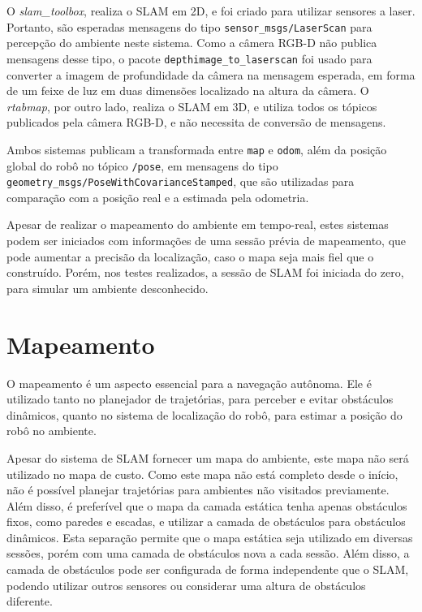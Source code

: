 \documentclass[repeatfields,xlists,xpacks,oneside,yearsonly]{ufrgscca}
\begin{document}
O \textit{slam\_toolbox}, realiza o SLAM em 2D, e foi criado para
utilizar sensores a laser. Portanto, são esperadas mensagens do tipo
\texttt{sensor\_msgs/LaserScan} para percepção do ambiente neste
sistema. Como a câmera RGB-D não publica mensagens desse tipo, o
pacote \texttt{depthimage\_to\_laserscan} foi usado para converter a
imagem de profundidade da câmera na mensagem esperada, em forma de um
feixe de luz em duas dimensões localizado na altura da câmera. O
\textit{rtabmap}, por outro lado, realiza o SLAM em 3D, e utiliza
todos os tópicos publicados pela câmera RGB-D, e não necessita de
conversão de mensagens.

Ambos sistemas publicam a transformada entre \texttt{map} e
\texttt{odom}, além da posição global do robô no tópico
\texttt{/pose}, em mensagens do tipo
\texttt{geometry\_msgs/PoseWithCovarianceStamped}, que são utilizadas
para comparação com a posição real e a estimada pela odometria.

Apesar de realizar o mapeamento do ambiente em tempo-real, estes
sistemas podem ser iniciados com informações de uma sessão prévia de
mapeamento, que pode aumentar a precisão da localização, caso o mapa
seja mais fiel que o construído. Porém, nos testes realizados, a
sessão de SLAM foi iniciada do zero, para simular um ambiente
desconhecido.

\section{Mapeamento}

O mapeamento é um aspecto essencial para a navegação autônoma. Ele é
utilizado tanto no planejador de trajetórias, para perceber e evitar
obstáculos dinâmicos, quanto no sistema de localização do robô, para
estimar a posição do robô no ambiente.

Apesar do sistema de SLAM fornecer um mapa do ambiente, este mapa não
será utilizado no mapa de custo. Como este mapa não está completo
desde o início, não é possível planejar trajetórias para ambientes
não visitados previamente. Além disso, é preferível que o mapa da
camada estática tenha apenas obstáculos fixos, como paredes e
escadas, e utilizar a camada de obstáculos para obstáculos dinâmicos.
Esta separação permite que o mapa estática seja utilizado em diversas
sessões, porém com uma camada de obstáculos nova a cada sessão. Além
disso, a camada de obstáculos pode ser configurada de forma
independente que o SLAM, podendo utilizar outros sensores ou
considerar uma altura de obstáculos diferente.
\end{document}
